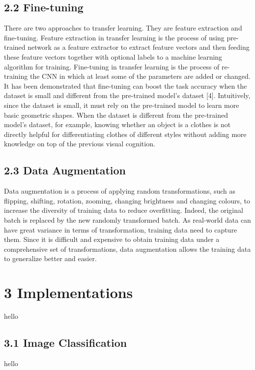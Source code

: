 \documentclass[12pt]{article}
\begin{document}
\subsection*{2.2 \hspace{10pt} Fine-tuning}
There are two approaches to transfer learning. They are feature extraction and fine-tuning.
Feature extraction in transfer learning is the process of using pre-trained network as a feature extractor to extract feature vectors and then feeding these feature vectors together with optional labels to a machine learning algorithm for training. Fine-tuning in transfer learning is the process of re-training the CNN in which at least some of the parameters are added or changed. It has been demonstrated that fine-tuning can boost the task accuracy when the dataset is small and different from the pre-trained model’s dataset [4]. Intuitively, since the dataset is small, it must rely on the pre-trained model to learn more basic geometric shapes. When the dataset is different from the pre-trained model's dataset, for example, knowing whether an object is a clothes is not directly helpful for differentiating clothes of different styles without adding more knowledge on top of the previous visual cognition.

\subsection*{2.3 \hspace{10pt} Data Augmentation}
Data augmentation is a process of applying random transformations, such as flipping, shifting, rotation, zooming, changing brightness and changing colours, to increase the diversity of training data to reduce overfitting. Indeed, the original batch is replaced by the new randomly transformed batch. As real-world data can have great variance in terms of transformation, training data need to capture them. Since it is difficult and expensive to obtain training data under a comprehensive set of transformations, data augmentation allows the training data to generalize better and easier.

\section*{\large{3 \hspace{10pt} Implementations}}
hello

\subsection*{3.1 \hspace{10pt} Image Classification}
hello
\end{document}
